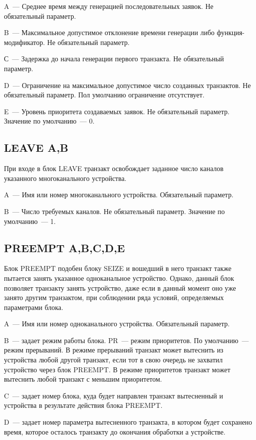 A~--- Среднее время между генерацией последовательных заявок. Не обязательный параметр.

B~--- Максимальное допустимое отклонение времени генерации либо функция-модификатор. Не обязательный параметр.

С~--- Задержка до начала генерации первого транзакта. Не обязательный параметр.

D~--- Ограничение на максимальное допустимое число созданных транзактов. Не обязательный параметр. Пол умолчанию ограничение отсутствует.

E~--- Уровень приоритета создаваемых заявок. Не обязательный параметр. Значение по умолчанию~--- 0.

\subsection*{LEAVE A,B}

При входе в блок LEAVE транзакт освобождает заданное число каналов указанного многоканального устройства.

A~--- Имя или номер многоканального устройства. Обязательный параметр.

B~--- Число требуемых каналов. Не обязательный параметр. Значение по умолчанию~--- 1.

\subsection*{PREEMPT A,B,C,D,E}

Блок PREEMPT подобен блоку SEIZE и вошедший в него транзакт также пытается занять указанное одноканальное устройство. Однако, данный блок позволяет транзакту занять устройство, даже если в данный момент оно уже занято другим транзактом, при соблюдении ряда условий, определяемых параметрами блока.

A~--- Имя или номер одноканального устройства. Обязательный параметр.

B~--- задает режим работы блока. PR~--- режим приоритетов. По умолчанию~--- режим прерываний. В режиме прерываний транзакт может вытеснить из устройства любой другой транзакт, если тот в свою очередь не захватил устройство через блок PREEMPT. В режиме приоритетов транзакт может вытеснить любой транзакт с меньшим приоритетом.

C~--- задает номер блока, куда будет направлен транзакт вытесненный и устройства в результате действия блока PREEMPT. 

D~--- задает номер параметра вытесненного транзакта, в  котором будет сохранено время, которое осталось транзакту до окончания обработки а устройстве.


